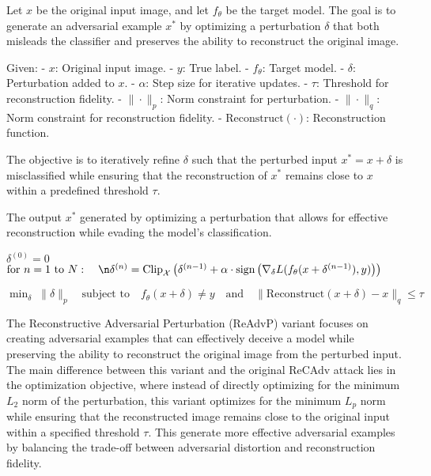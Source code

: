 Let $x$ be the original input image, and let $f_{\theta}$ be the target model. The goal is to generate an adversarial example $x^*$ by optimizing a perturbation $\delta$ that both misleads the classifier and preserves the ability to reconstruct the original image.

Given:
- $x$: Original input image.
- $y$: True label.
- $f_{\theta}$: Target model.
- $\delta$: Perturbation added to $x$.
- $\alpha$: Step size for iterative updates.
- $\tau$: Threshold for reconstruction fidelity.
- $\|\cdot\|_p$: Norm constraint for perturbation.
- $\|\cdot\|_q$: Norm constraint for reconstruction fidelity.
- $\text{Reconstruct}(\cdot)$: Reconstruction function.

The objective is to iteratively refine $\delta$ such that the perturbed input $x^* = x + \delta$ is misclassified while ensuring that the reconstruction of $x^*$ remains close to $x$ within a predefined threshold $\tau$.


The output $x^*$ generated by optimizing a perturbation that allows for effective reconstruction while evading the model's classification.

$\delta^{(0)} = 0$
$\text{for } n = 1 \text{ to } N: \quad\n\delta^{(n)} = \text{Clip}_{\mathcal{X}} \left( \delta^{(n-1)} + \alpha \cdot \text{sign} \left( \nabla_\delta L(f_\theta(x + \delta^{(n-1)}), y) \right) \right)$

$\min_{\delta} \; \| \delta \|_p \quad \text{subject to} \quad f_\theta(x + \delta) \neq y \quad \text{and} \quad \| \text{Reconstruct}(x + \delta) - x \|_q \leq \tau$

The Reconstructive Adversarial Perturbation (ReAdvP) variant focuses on creating adversarial examples that can effectively deceive a model while preserving the ability to reconstruct the original image from the perturbed input. The main difference between this variant and the original ReCAdv attack lies in the optimization objective, where instead of directly optimizing for the minimum $L_2$ norm of the perturbation, this variant optimizes for the minimum $L_p$ norm while ensuring that the reconstructed image remains close to the original input within a specified threshold $\tau$. This generate more effective adversarial examples by balancing the trade-off between adversarial distortion and reconstruction fidelity.